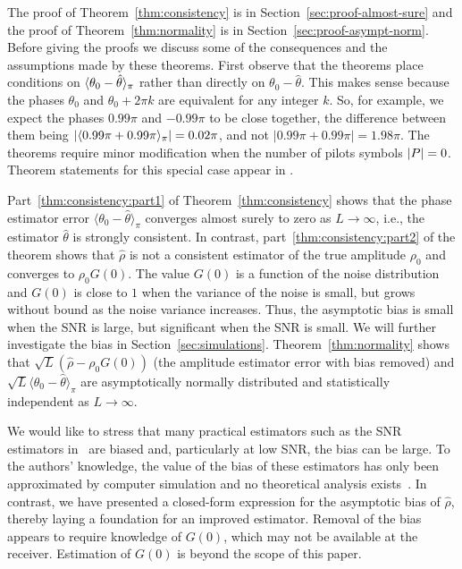 \documentclass[journal]{IEEEtran}
\begin{document}
The proof of Theorem~\ref{thm:consistency} is in Section~\ref{sec:proof-almost-sure} and the proof of Theorem~\ref{thm:normality} is in Section~\ref{sec:proof-asympt-norm}. Before giving the proofs we discuss some of the consequences and the assumptions made by these theorems.  
First observe that the theorems place conditions on $\langle \theta_0 - \hat{\theta} \rangle_\pi$ rather than directly on $\theta_0 - \hat{\theta}$.  This makes sense because the phases $\theta_0$ and $\theta_0 + 2\pi k$ are equivalent for any integer $k$. So, for example, we expect the phases $0.99\pi$ and $-0.99\pi$ to be close together, the difference between them being $\vert\langle 0.99\pi + 0.99\pi \rangle_\pi\vert = 0.02\pi$, and not $\vert 0.99\pi + 0.99\pi\vert = 1.98\pi$.  %
The theorems require minor modification when the number of pilots symbols ${\left\vert P \right\vert} = 0$.  Theorem statements for this special case appear in \cite{McKilliam_leastsqPSKnoncoICASSP_2012}.

Part~\ref{thm:consistency:part1} of Theorem~\ref{thm:consistency} shows that the phase estimator error $\langle\theta_0 - \hat{\theta}\rangle_\pi$ converges almost surely to zero as $L\rightarrow \infty$, i.e., the estimator $\hat{\theta}$ is strongly consistent. In contrast, part~\ref{thm:consistency:part2} of the theorem shows that $\hat{\rho}$ is not a consistent estimator of the true amplitude $\rho_0$ and converges to $\rho_0 G(0)$.  The value $G(0)$ is a function of the noise distribution and $G(0)$ is close to $1$ when the variance of the noise is small, but grows without bound as the noise variance increases.  Thus, the asymptotic bias is small when the SNR is large, but significant when the SNR is small.  We will further investigate the bias in Section~\ref{sec:simulations}.  Theorem~\ref{thm:normality} shows that $\sqrt{L}(\hat{\rho} - \rho_0 G(0))$ (the amplitude estimator error with bias removed) and $\sqrt{L}\langle\theta_0 - \hat{\theta}\rangle_\pi$ are asymptotically normally distributed and statistically independent as $L\rightarrow\infty$.

We would like to stress that many practical estimators such as the SNR estimators in~\cite{Pauluzzi2000} are biased and, particularly at low SNR, the bias can be large.  To the authors' knowledge, the value of the bias of these estimators has only been approximated by computer simulation and no theoretical analysis exists~\cite{Pauluzzi2000}.  In contrast, we have presented a closed-form expression for the asymptotic bias of $\hat\rho$, thereby laying a foundation for an improved estimator.  Removal of the bias appears to require knowledge of $G(0)$, which may not be available at the receiver. Estimation of $G(0)$ is beyond the scope of this paper.
\end{document}
